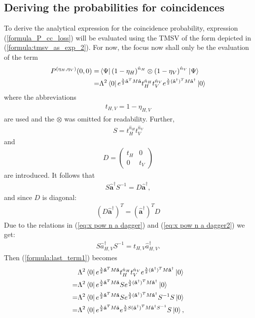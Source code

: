 \documentclass[%
 reprint,
 amsmath,amssymb,
 aps,
twocolumn
]{revtex4-2}
\begin{document}
\subsection{Deriving the probabilities for coincidences}
To derive the analytical expression for the coincidence probability, expression (\ref{formula_P_cc_loss}) will be evaluated using the TMSV of the form depicted in (\ref{formula:tmsv_as_exp_2}). For now, the focus now shall only be the evaluation of the term
\begin{align}
P^{(\eta_H,\eta_V)}(0,0)=&\bra{\Psi}\left(1-\eta_H\right)^{\hat{n}_H}\otimes \left(1-\eta_V\right)^{\hat{n}_V}\ket{\Psi}\label{eq:p00etahv}\\
=&\Lambda^2\bra{0} e^{\frac{\lambda}{2} \mathbf{\hat a}^T M\mathbf{\hat a}} t_H^{\hat{n}_H} t_V^{\hat{n}_V} e^{\frac{\lambda}{2} (\mathbf{\hat a^{\dagger}})^T M \mathbf{\hat a^{\dagger}}} \ket{0}\label{formula:last_term1}
\end{align}
where the abbreviations
\begin{align}\label{eq:t_eta}
    t_{H,V}=1-\eta_{H,V}
\end{align}
are used and the $\otimes$ was omitted for readability. Further, 
\begin{align}
S=t_H^{\hat{n}_H} t_V^{\hat{n}_V}
\end{align}
and
\begin{align}
D=
\begin{pmatrix}
    t_H & 0 \\
    0 & t_V 
    \end{pmatrix}
\end{align}
are introduced. It follows that
\begin{align}\label{formula:SaS_Da}
S\mathbf{\hat a^{\dagger}}S^{-1}=D\mathbf{\hat a^{\dagger}},
\end{align}
and since $D$ is diagonal:
\begin{align}
\left(D\mathbf{\hat a^{\dagger}}\right)^T=(\mathbf{\hat a^{\dagger}})^T D
\end{align}
Due to the relations in (\ref{eq:x pow n a dagger}) and (\ref{eq:x pow n a dagger2}) we get:
\begin{align}
S\hat a_{H,V}^{\dagger}S^{-1}=t_{H,V}\hat a_{H,V}^{\dagger}.
\end{align}
Then (\ref{formula:last_term1}) becomes
\begin{align}
&\Lambda^2\bra{0} e^{\frac{\lambda}{2} \mathbf{\hat a}^T M\mathbf{\hat a}} t_H^{\hat{n}_H} t_V^{\hat{n}_V} e^{\frac{\lambda}{2} (\mathbf{\hat a^{\dagger}})^T M \mathbf{\hat a^{\dagger}}} \ket{0}\\
=&\Lambda^2\bra{0} e^{\frac{\lambda}{2} \mathbf{\hat a}^T M\mathbf{\hat a}} S e^{\frac{\lambda}{2} (\mathbf{\hat a^{\dagger}})^T M \mathbf{\hat a^{\dagger}}} \ket{0}\\
=&\Lambda^2\bra{0} e^{\frac{\lambda}{2} \mathbf{\hat a}^T M\mathbf{\hat a}} S e^{\frac{\lambda}{2} (\mathbf{\hat a^{\dagger}})^T M \mathbf{\hat a^{\dagger}}}S^{-1}S \ket{0}\\
=&\Lambda^2\bra{0} e^{\frac{\lambda}{2} \mathbf{\hat a}^T M\mathbf{\hat a}} e^{\frac{\lambda}{2} S (\mathbf{\hat a^{\dagger}})^T M \mathbf{\hat a^{\dagger}}S^{-1}}S \ket{0},
\end{align}
\end{document}
